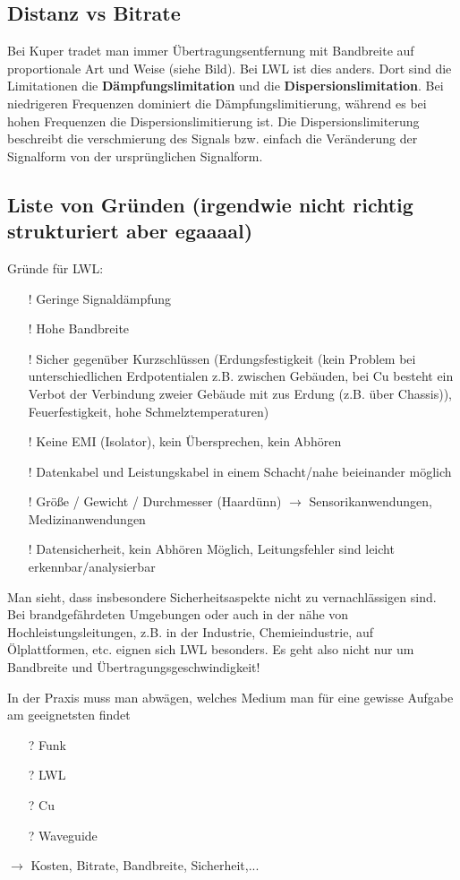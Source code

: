 \documentclass[11pt, a4paper]{article}
\begin{document}
\subsection{Distanz vs Bitrate}

\begin{figure}[H]
\centering
{}
\end{figure}
Bei Kuper tradet man immer Übertragungsentfernung mit Bandbreite auf proportionale Art und Weise (siehe Bild).
Bei LWL ist dies anders. Dort sind die Limitationen die \textbf{Dämpfungslimitation} und die \textbf{Dispersionslimitation}. Bei niedrigeren Frequenzen dominiert die Dämpfungslimitierung, während es bei hohen Frequenzen die Dispersionslimitierung ist. Die Dispersionslimiterung beschreibt die verschmierung des Signals bzw. einfach die Veränderung der Signalform von der ursprünglichen Signalform.


\begin{figure}[H]
\centering
{}
\end{figure}

\pagebreak
\subsection{Liste von Gründen (irgendwie nicht richtig strukturiert aber egaaaal)}
Gründe für LWL:
\begin{itemize}
  \item[!] Geringe Signaldämpfung
  \item[!] Hohe Bandbreite
  \item[!] Sicher gegenüber Kurzschlüssen (Erdungsfestigkeit (kein Problem bei unterschiedlichen Erdpotentialen z.B. zwischen Gebäuden, bei Cu besteht ein Verbot der Verbindung zweier Gebäude mit zus Erdung (z.B. über Chassis)), Feuerfestigkeit, hohe Schmelztemperaturen)
  \item[!] Keine EMI (Isolator), kein Übersprechen, kein Abhören
  \item[!] Datenkabel und Leistungskabel in einem Schacht/nahe beieinander möglich
  \item[!] Größe / Gewicht / Durchmesser (Haardünn) $\rightarrow$ Sensorikanwendungen, Medizinanwendungen
  \item[!] Datensicherheit, kein Abhören Möglich, Leitungsfehler sind leicht erkennbar/analysierbar
\end{itemize}

Man sieht, dass insbesondere Sicherheitsaspekte nicht zu vernachlässigen sind. Bei brandgefährdeten Umgebungen oder auch in der nähe von Hochleistungsleitungen, z.B. in der Industrie, Chemieindustrie, auf Ölplattformen, etc. eignen sich LWL besonders.
Es geht also nicht nur um Bandbreite und Übertragungsgeschwindigkeit!

In der Praxis muss man abwägen, welches Medium man für eine gewisse Aufgabe am geeignetsten findet
\begin{itemize}
  \item[?] Funk
  \item[?] LWL
  \item[?] Cu
  \item[?] Waveguide
\end{itemize}
$\rightarrow$ Kosten, Bitrate, Bandbreite, Sicherheit,...

\end{document}
